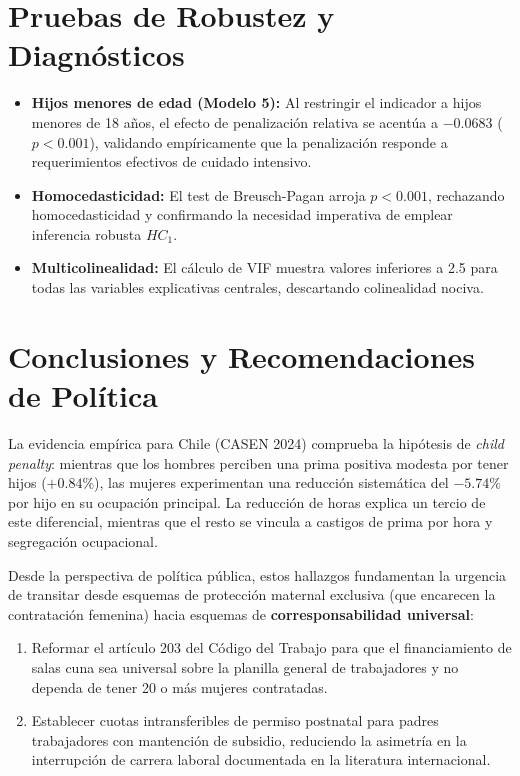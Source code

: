 \documentclass[11pt,a4paper]{article}
\begin{document}
\section{Pruebas de Robustez y Diagnósticos}
\begin{itemize}
    \item \textbf{Hijos menores de edad (Modelo 5):} Al restringir el indicador a hijos menores de 18 años, el efecto de penalización relativa se acentúa a $-0.0683$ ($p < 0.001$), validando empíricamente que la penalización responde a requerimientos efectivos de cuidado intensivo.
    \item \textbf{Homocedasticidad:} El test de Breusch-Pagan arroja $p < 0.001$, rechazando homocedasticidad y confirmando la necesidad imperativa de emplear inferencia robusta $HC_1$.
    \item \textbf{Multicolinealidad:} El cálculo de VIF muestra valores inferiores a 2.5 para todas las variables explicativas centrales, descartando colinealidad nociva.
\end{itemize}

\section{Conclusiones y Recomendaciones de Política}
La evidencia empírica para Chile (CASEN 2024) comprueba la hipótesis de \textit{child penalty}: mientras que los hombres perciben una prima positiva modesta por tener hijos ($+0.84\%$), las mujeres experimentan una reducción sistemática del $-5.74\%$ por hijo en su ocupación principal. La reducción de horas explica un tercio de este diferencial, mientras que el resto se vincula a castigos de prima por hora y segregación ocupacional.

Desde la perspectiva de política pública, estos hallazgos fundamentan la urgencia de transitar desde esquemas de protección maternal exclusiva (que encarecen la contratación femenina) hacia esquemas de \textbf{corresponsabilidad universal}:
\begin{enumerate}
    \item Reformar el artículo 203 del Código del Trabajo para que el financiamiento de salas cuna sea universal sobre la planilla general de trabajadores y no dependa de tener 20 o más mujeres contratadas.
    \item Establecer cuotas intransferibles de permiso postnatal para padres trabajadores con mantención de subsidio, reduciendo la asimetría en la interrupción de carrera laboral documentada en la literatura internacional.
\end{enumerate}
\end{document}
